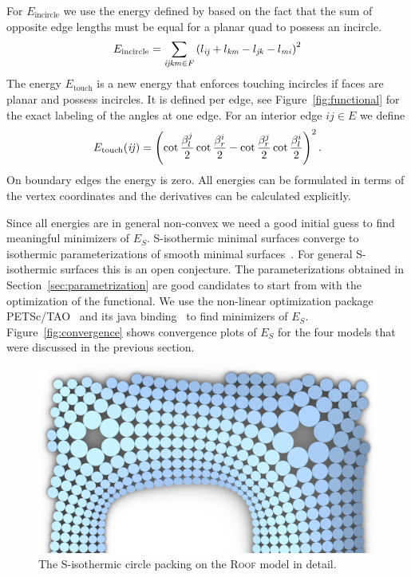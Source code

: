\documentclass[twoside]{article}
\begin{document}
For $E_{\mathrm{incircle}}$ we use the energy defined by
\cite{schiftner-2009-cp} based on the fact that the sum of opposite edge
lengths must be equal for a planar quad to possess an incircle.
\begin{equation}
E_{\mathrm{incircle}} = \sum_{\mathrm{\it{ijkm}} \in F} \left( l_{\mathrm{\it{ij}}} + 
l_{\mathrm{\it{km}}} - l_{\mathrm{\it{jk}}} - l_{\mathrm{\it{mi}}} \right)^2
\end{equation}
The energy
$E_{\mathrm{touch}}$ is a new energy that enforces touching incircles
if faces are planar and possess incircles.  It is defined per edge, see
Figure~\ref{fig:functional} for the exact labeling of the angles at one edge.
For an interior edge $ij\in E$ we define
\begin{equation}
  E_{\mathrm{touch}}(\mathrm{\it{ij}})=
  \left(\cot\frac{\beta^j_l}{2}\cot\frac{\beta^i_r}{2} - 
\cot\frac{\beta^j_r}{2}\cot\frac{\beta^i_l}{2}\right)^2.
\end{equation}
On boundary edges the energy is zero. All energies can be formulated 
in terms of the vertex coordinates and the derivatives can be calculated explicitly.



Since all energies are in general non-convex we need a good initial guess to 
find meaningful minimizers of $E_S$.
S-isothermic minimal surfaces converge to isothermic parameterizations of
smooth minimal surfaces~\cite{BobHofSpr06}. For general S-isothermic surfaces
this is an open conjecture. The parameterizations obtained in
Section~\ref{sec:parametrization} are good candidates to start from with the
optimization of the functional.
We use the non-linear optimization package PETSc/TAO~\cite{petsc-web-page,
tao-user-ref} and its java binding~\cite{jpetsctao-web-page} to find
minimizers of $E_S$. Figure~\ref{fig:convergence} shows convergence plots of
$E_S$ for the four models that were discussed in the previous section.
\begin{figure}[t]
\centering
\includegraphics[width=\linewidth]{../images/dach_example01_circles.png}
\caption{The S-isothermic circle packing on the \textsc{Roof} model in detail.}
\end{figure}
\end{document}
